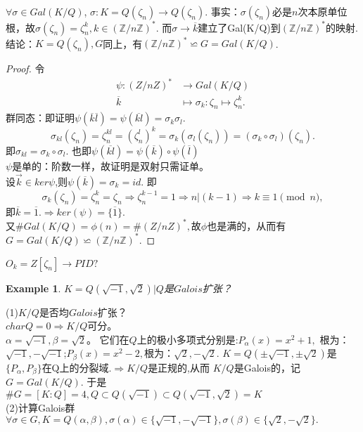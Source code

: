 \documentclass[UTF8]{article}
\newtheorem{exa}{Example}[section]
\begin{document}
$\forall \sigma\in Gal(K/Q)$,
$\sigma:K=Q(\zeta_n)\longrightarrow Q(\zeta_n)$.
事实：$\sigma(\zeta_n)$必是$n$次本原单位根，故$\sigma(\zeta_n)=\zeta_n^k,k\in(\mathbb{Z}/n\mathbb{Z})^{*}$.
而$\sigma \longrightarrow \overline{k}$建立了Gal(K/Q)到$(\mathbb{Z}/n\mathbb{Z})^{*}$的映射.\\
结论：$K=Q(\zeta_n),G$同上，有$(\mathbb{Z}/n\mathbb{Z})^{*}\backsimeq G=Gal(K/Q)$.
\begin{proof}
	令
	\[
	\begin{split}
	\psi:(Z/nZ)^*&\longrightarrow Gal(K/Q)\\
	\overline{k}&\longmapsto \sigma_k:\zeta_n\longmapsto \zeta_n^k.
	\end{split}
	\]
	群同态：即证明$\psi(\overline{k}\overline{l})=\psi(\overline{kl})=\sigma_k\sigma_l.$\\
	$$\sigma_{kl}(\zeta_n)=\zeta_n^{kl}=(\zeta_n^l)^k=\sigma_k(\sigma_l(\zeta_n))=(\sigma_k\circ\sigma_l)(\zeta_n).$$
	即$\sigma_{kl}=\sigma_k\circ\sigma_l.$
	也即$\psi(\overline{kl})=\psi(\overline{k})\circ\psi(\overline{l})$\\
	$\psi$是单的：阶数一样，故证明是双射只需证单。\\
	设$\overrightarrow{k}\in ker\psi$,则$\psi(\overline{k})=\sigma_k=id.$
	即
	$$\sigma_k(\zeta_n)=\zeta_n^k=\zeta_n\Rightarrow \zeta_n^{k-1}=1\Rightarrow n|(k-1)\Rightarrow k\equiv 1\pmod n,$$即$\overline{k}=\overline{1}.\Rightarrow ker(\psi)=\{\overline{1}\}.$\\
	又$\#Gal(K/Q)=\phi(n)=\#(Z/nZ)^*,$故$\phi $也是满的，从而有$G=Gal(K/Q)\backsimeq (\mathbb{Z}/n\mathbb{Z})^{*}$.
\end{proof}
$O_{k}=Z[\zeta_n]\rightarrow PID?$
\begin{exa}
$K=Q(\sqrt{-1},\sqrt{2})|Q$是$Galois$扩张？
\end{exa}
(1)$K/Q$是否均$Galois$扩张？\\
$charQ=0\Rightarrow K/Q$可分。\\
$\alpha=\sqrt{-1},\beta=\sqrt{2}$。
它们在$Q$上的极小多项式分别是:$P_{\alpha}(x)=x^2+1,$
根为：$\sqrt{-1},-\sqrt{-1}$;$P_{\beta}(x)=x^2-2,$根为：$\sqrt{2},-\sqrt{2}.$ $K=Q(\pm\sqrt{-1},\pm\sqrt{2})$是$\{P_\alpha,P_\beta\}$在Q上的分裂域.$\Rightarrow K/Q$是正规的,从而
$K/Q $是Galois的，记$G=Gal(K/Q).$
于是$\#G=[K:Q]=4,Q\subset Q(\sqrt{-1})\subset Q(\sqrt{-1},\sqrt{2})=K $\\
(2)计算Galois群\\
$\forall \sigma \in G,K=Q(\alpha,\beta),\sigma(\alpha)\in \{\sqrt{-1},-\sqrt{-1}\},\sigma(\beta)\in \{\sqrt{2},-\sqrt{2}\}.$\\
\end{document}
